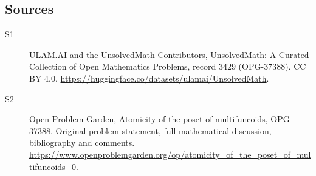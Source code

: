 \documentclass[11pt]{article}
\begin{document}
\subsection{Sources}
\begin{description}
\item[\hypertarget{source:3429:1}{S1}] ULAM.AI and the UnsolvedMath Contributors, UnsolvedMath: A Curated Collection of Open Mathematics Problems, record 3429 (OPG-37388). CC BY 4.0. \url{https://huggingface.co/datasets/ulamai/UnsolvedMath}.
\item[\hypertarget{source:3429:2}{S2}] Open Problem Garden, Atomicity of the poset of multifuncoids, OPG-37388. Original problem statement, full mathematical discussion, bibliography and comments. \url{https://www.openproblemgarden.org/op/atomicity_of_the_poset_of_multifuncoids_0}.
\end{description}
\label{end:3429}
\end{document}
